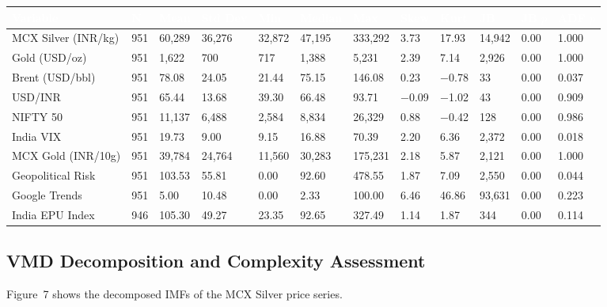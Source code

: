 \documentclass[12pt,a4paper]{article}
\newcommand{\hdrrow}[1]{\textcolor{white}{\textbf{#1}}}
\begin{document}
\noindent\scriptsize\setlength{\tabcolsep}{3.5pt}
\begin{tabular}{L{2.2cm} C{0.55cm} C{1.5cm} C{1.5cm} C{1.4cm} C{1.5cm} C{1.6cm}
                C{1.1cm} C{1.1cm} C{1.2cm} C{1.1cm} C{1.1cm}}
\hdrrow{Variable} & \hdrrow{N} & \hdrrow{Mean} & \hdrrow{Std Dev} & \hdrrow{Min} & \hdrrow{Median} & \hdrrow{Max} & \hdrrow{Skew} & \hdrrow{Kurt} & \hdrrow{JB} & \hdrrow{JB $p$} & \hdrrow{ADF $p$} \\
\hline
MCX Silver (INR/kg) & 951 & 60,289 & 36,276 & 32,872 & 47,195  & 333,292 & 3.73 & 17.93 & 14,942 & 0.00 & 1.000 \\
Gold (USD/oz)       & 951 & 1,622  & 700    & 717    & 1,388   & 5,231   & 2.39 &  7.14 &  2,926 & 0.00 & 1.000 \\
Brent (USD/bbl)     & 951 & 78.08  & 24.05  & 21.44  & 75.15   & 146.08  & 0.23 & $-$0.78 & 33  & 0.00 & 0.037 \\
USD/INR             & 951 & 65.44  & 13.68  & 39.30  & 66.48   & 93.71   & $-$0.09 & $-$1.02 & 43 & 0.00 & 0.909 \\
NIFTY 50            & 951 & 11,137 & 6,488  & 2,584  & 8,834   & 26,329  & 0.88 & $-$0.42 & 128 & 0.00 & 0.986 \\
India VIX           & 951 & 19.73  & 9.00   & 9.15   & 16.88   & 70.39   & 2.20 &  6.36 &  2,372 & 0.00 & 0.018 \\
MCX Gold (INR/10g)  & 951 & 39,784 & 24,764 & 11,560 & 30,283  & 175,231 & 2.18 &  5.87 &  2,121 & 0.00 & 1.000 \\
Geopolitical Risk   & 951 & 103.53 & 55.81  & 0.00   & 92.60   & 478.55  & 1.87 &  7.09 &  2,550 & 0.00 & 0.044 \\
Google Trends       & 951 & 5.00   & 10.48  & 0.00   & 2.33    & 100.00  & 6.46 & 46.86 & 93,631 & 0.00 & 0.223 \\
India EPU Index     & 946 & 105.30 & 49.27  & 23.35  & 92.65   & 327.49  & 1.14 &  1.87 &    344 & 0.00 & 0.114 \\
\end{tabular}
\renewcommand{\arraystretch}{1}\normalsize\setlength{\tabcolsep}{6pt}
\vspace{8pt}

\subsection{VMD Decomposition and Complexity Assessment}

Figure~7 shows the decomposed IMFs of the MCX Silver price series.
\end{document}
